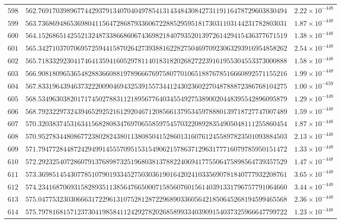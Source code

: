 \documentclass[12pt,reqno]{amsart}
\theoremstyle{remark}
\begin{document}
\begin{longtable}{clc}
$598$ & $562.7691703989677442937913407040497854131434843084273119116478729603830494$ & $2.22\times 10^{-448}$ \\
$599$ & $563.7368694865369804115647286879336067228852959518173031103144231782803031$ & $1.87\times 10^{-448}$ \\
$600$ & $564.1526865142552132487338668606743698218407935201397261429415436377671519$ & $1.38\times 10^{-448}$ \\
$601$ & $565.3427103707069572594415870264273938816228275046970923063293916954858262$ & $2.54\times 10^{-448}$ \\
$602$ & $565.7183329230417464135941605297811401831820268272239161955304553373000888$ & $1.58\times 10^{-448}$ \\
$603$ & $566.9081809653654828836608819789666769758077010651887678516660892571155216$ & $1.99\times 10^{-448}$ \\
$604$ & $567.8331964394637322200904694325391557344124302360227048788872386768104275$ & $1.00\times 10^{-659}$ \\
$605$ & $568.5349630382017174502788311218956776403455492753890020448395542896095879$ & $1.29\times 10^{-448}$ \\
$606$ & $568.7923229732439465292521612920467120856613795345978880139718727747007489$ & $1.59\times 10^{-448}$ \\
$607$ & $570.3203837453163415682808347697065585975457032208928354905048111255860454$ & $1.87\times 10^{-448}$ \\
$608$ & $570.9527834480867723802824380113808504152860131607612455897823501093884503$ & $2.13\times 10^{-448}$ \\
$609$ & $571.7947728448724294991455570951531549062157863712963177716079785950151472$ & $1.33\times 10^{-448}$ \\
$610$ & $572.2923254072860791376898732519680381378822406941775506475898564739357529$ & $1.47\times 10^{-448}$ \\
$611$ & $573.3698514543077851079019334527503036190164202410335690781840777932208761$ & $3.65\times 10^{-448}$ \\
$612$ & $574.2341687069315828935113856476650007158560760156140391331796757791064660$ & $3.44\times 10^{-448}$ \\
$613$ & $575.0477532303066631722961310752812872296890336056421850645268194599465568$ & $2.36\times 10^{-448}$ \\
$614$ & $575.7978168157123730419858411242927820268589933403909154037325966647799722$ & $1.23\times 10^{-448}$ \\

\end{longtable}
\end{document}
